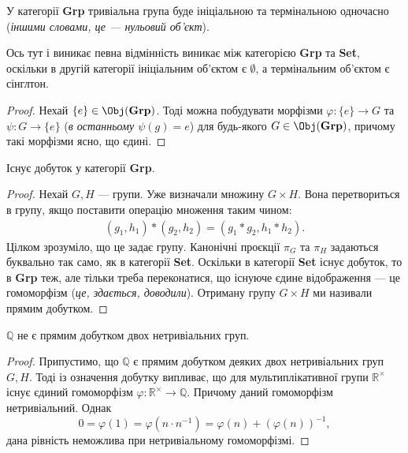 \documentclass{math_library}
\begin{document}
\begin{proposition}
У категорії \textbf{Grp} тривіальна група буде ініціальною та термінальною одночасно (\textit{іншими словами, це --- нульовий об'єкт}).
\end{proposition}

Ось тут і виникає певна відмінність виникає між категорією \textbf{Grp} та \textbf{Set}, оскільки в другій категорії ініціальним об'єктом є $\emptyset$, а термінальним об'єктом є сінглтон.

\begin{proof}
Нехай $\{e\} \in \Obj(\textbf{Grp})$. Тоді можна побудувати морфізми $\varphi \colon \{e\} \to G$ та $\psi \colon G \to \{e\}$ (\textit{в останньому $\psi(g) = e$}) для будь-якого $G \in \Obj(\textbf{Grp})$, причому такі морфізми ясно, що єдині.
\end{proof}

\begin{proposition}
Існує добуток у категорії \textbf{Grp}.
\end{proposition}

\begin{proof}
Нехай $G,H$ --- групи. Уже визначали множину $G \times H$. Вона перетвориться в групу, якщо поставити операцію множення таким чином:
\begin{align*}
(g_1,h_1) * (g_2,h_2) = (g_1 * g_2, h_1 * h_2).
\end{align*}
Цілком зрозуміло, що це задає групу. Канонічні проєкції $\pi_G$ та $\pi_H$ задаються буквально так само, як в категорії \textbf{Set}. Оскільки в категорії \textbf{Set} існує добуток, то в \textbf{Grp} теж, але тільки треба переконатися, що існуюче єдине відображення --- це гомоморфізм (\textit{це, здається, доводили}).
Отриману групу $G \times H$ ми називали прямим добутком.
\end{proof}

\begin{proposition}
$\mathbb{Q}$ не є прямим добутком двох нетривіальних груп.
\end{proposition}

\begin{proof}
Припустимо, що $\mathbb{Q}$ є прямим добутком деяких двох нетривіальних груп $G,H$. Тоді із означення добутку випливає, що для мультиплікативної групи $\mathbb{R}^\times$ існує єдиний гомоморфізм $\varphi \colon \mathbb{R}^\times \to \mathbb{Q}$. Причому даний гомоморфізм нетривіальний. Однак
\[
0 = \varphi(1) = \varphi(n \cdot n^{-1}) = \varphi(n) + (\varphi(n))^{-1},
\]
дана рівність неможлива при нетривіальному гомоморфізмі.
\end{proof}
\end{document}
